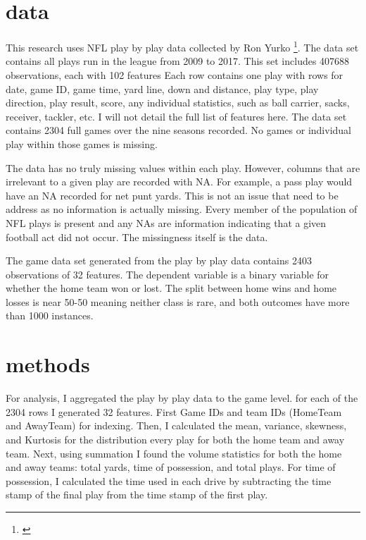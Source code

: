 \documentclass[12pt,english]{article}
\begin{document}
\section{data}
This research uses NFL play by play data collected by Ron Yurko \footnote{\citet{Yur18}}.  The data set contains all plays run in the league from 2009 to 2017.  This set includes 407688 observations, each with 102 features  Each row contains one play with rows for date, game ID, game time, yard line, down and distance, play type, play direction, play result, score, any individual statistics, such as ball carrier, sacks, receiver, tackler, etc.  I will not detail the full list of features here.  The data set contains 2304 full games over the nine seasons recorded.  No games or individual play within those games is missing.

The data has no truly missing values within each play.  However, columns that are irrelevant to a given play are recorded with NA.  For example, a pass play would have an NA recorded for net punt yards.  This is not an issue that need to be address as no information is actually missing.  Every member of the population of NFL plays is present and any NAs are information indicating that a given football act did not occur.  The missingness itself is the data.

The game data set generated from the play by play data contains 2403 observations of 32 features.  The dependent variable is a binary variable for whether the home team won or lost.  The split between home wins and home losses is near 50-50 meaning neither class is rare, and both outcomes have more than 1000 instances.

\section{methods}
For analysis, I aggregated the play by play data to the game level.  for each of the 2304 rows I generated 32 features.  First Game IDs and team IDs (HomeTeam and AwayTeam) for indexing.  Then, I calculated the mean, variance, skewness, and Kurtosis for the distribution every play for both the home team and away team. Next, using summation I found the volume statistics for both the home and away teams: total yards, time of possession, and total plays.  For time of possession, I calculated the time used in each drive by subtracting the time stamp of the final play from the time stamp of the first play.    
\end{document}
